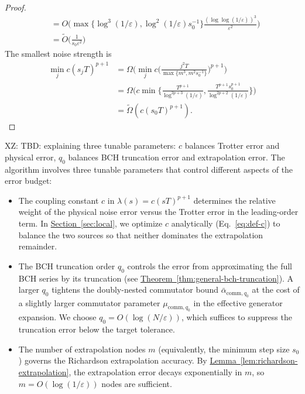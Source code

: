 \documentclass[aps,pra,reprint,groupedaddress,floatfix]{revtex4-2}
\newcommand{\thm}[1]{\hyperref[thm:#1]{Theorem~\ref*{thm:#1}}}
\newcommand{\lem}[1]{\hyperref[lem:#1]{Lemma~\ref*{lem:#1}}}
\renewcommand{\sec}[1]{\hyperref[sec:#1]{Section~\ref*{sec:#1}}}
\newcommand{\eps}{\varepsilon}
\newcommand{\xz}[1]{{\color{cyan} XZ: #1}}
\begin{document}
\begin{proof}
\begin{align*}
        &=O\Big( \max\{\log^3(1/\eps), \log^2(1/\eps)s_0^{-1}\}\frac{(\log\log (1/\eps))^3}{\eps^2}\Big) \\
        &= \widetilde{O}\Big(\frac{1}{s_0\eps^2}\Big)
    \end{align*}
    The smallest noise strength is \begin{align*}
        \min_{j}c(s_jT)^{p+1} &= \Omega\Big(\min_{j}c\Big(\frac{j^2T}{\max\{m^3, m^2s_0^{-1}\}}\Big)^{p+1}\Big) \\
        &=\Omega\Big(c\min\Big\{\frac{T^{p+1}}{\log^{3p+3}(1/\eps)}, \frac{ T^{p+1}s_0^{p+1}}{\log^{2p+2}(1/\eps)}\Big\}\Big)\\
        & = \widetilde{\Omega}(c (s_0 T)^{p+1}).
    \end{align*}
\end{proof}
\xz{TBD: explaining three tunable parameters: $c$ balances Trotter error and physical error, $q_0$ balances BCH truncation error and extrapolation error.}
The algorithm involves three tunable parameters that control different aspects of the error budget:
\begin{itemize}
    \item The coupling constant $c$ in $\lambda(s)=c(sT)^{p+1}$ determines the relative weight of the physical noise error versus the Trotter error in the leading-order term. In \sec{local}, we optimize $c$ analytically (Eq.~\eqref{eq:def-c}) to balance the two sources so that neither dominates the extrapolation remainder.
    \item The BCH truncation order $q_0$ controls the error from approximating the full BCH series by its truncation (see \thm{general-bch-truncation}). A larger $q_0$ tightens the doubly-nested commutator bound $\bar{\alpha}_{\mathrm{comm},q_0}$ at the cost of a slightly larger commutator parameter $\mu_{\mathrm{comm},q_0}$ in the effective generator expansion. We choose $q_0 = O(\log(N/\eps))$, which suffices to suppress the truncation error below the target tolerance.
    \item The number of extrapolation nodes $m$ (equivalently, the minimum step size $s_0$) governs the Richardson extrapolation accuracy. By \lem{richardson-extrapolation}, the extrapolation error decays exponentially in $m$, so $m = O(\log(1/\eps))$ nodes are sufficient.
\end{itemize}
\end{document}
